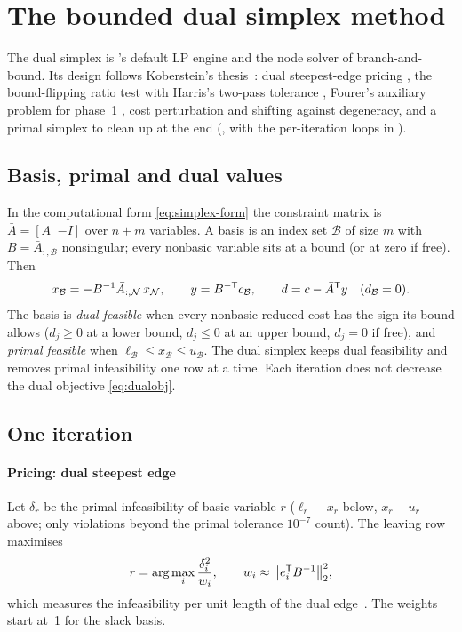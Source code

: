 \section{The bounded dual simplex method}\label{sec:simplex}

The dual simplex is \nirnay{}'s default LP engine and the node solver of branch-and-bound. Its
design follows Koberstein's thesis~\cite{koberstein2005}: dual steepest-edge pricing
\cite{forrest1992}, the bound-flipping ratio test \cite{maros2003} with Harris's two-pass
tolerance \cite{harris1973}, Fourer's auxiliary problem for phase~1 \cite{fourer1994}, cost
perturbation and shifting against degeneracy, and a primal simplex to clean up at the end
(, with the per-iteration loops in ).

\subsection{Basis, primal and dual values}
In the computational form \eqref{eq:simplex-form} the constraint matrix is $\bar A=[A\;\;{-I}]$ over
$n+m$ variables. A basis is an index set $\mathcal B$ of size $m$ with $B=\bar A_{:,\mathcal B}$
nonsingular; every nonbasic variable sits at a bound (or at zero if free). Then
\begin{equation}\label{eq:basic}
  x_{\mathcal B} = -B^{-1}\bar A_{:,\mathcal N}\,x_{\mathcal N},\qquad
  y = B^{-\mathsf{T}} c_{\mathcal B},\qquad d = c - \bar A^{\mathsf{T}} y\quad(d_{\mathcal B}=0).
\end{equation}
The basis is \emph{dual feasible} when every nonbasic reduced cost has the sign its bound allows
($d_j\ge0$ at a lower bound, $d_j\le0$ at an upper bound, $d_j=0$ if free), and
\emph{primal feasible} when $\ell_{\mathcal B}\le x_{\mathcal B}\le u_{\mathcal B}$. The dual
simplex keeps dual feasibility and removes primal infeasibility one row at a time. Each iteration
does not decrease the dual objective \eqref{eq:dualobj}.

\subsection{One iteration}
\paragraph{Pricing: dual steepest edge}
Let $\delta_r$ be the primal infeasibility of basic variable $r$ ($\ell_r-x_r$ below, $x_r-u_r$
above; only violations beyond the primal tolerance $10^{-7}$ count). The leaving row maximises
\begin{equation}\label{eq:dse}
  r = \arg\max_i \frac{\delta_i^2}{w_i},\qquad w_i \approx \bigl\|e_i^{\mathsf{T}} B^{-1}\bigr\|_2^2 ,
\end{equation}
which measures the infeasibility per unit length of the dual edge~\cite{forrest1992}. The weights start
at~1 for the slack basis.

